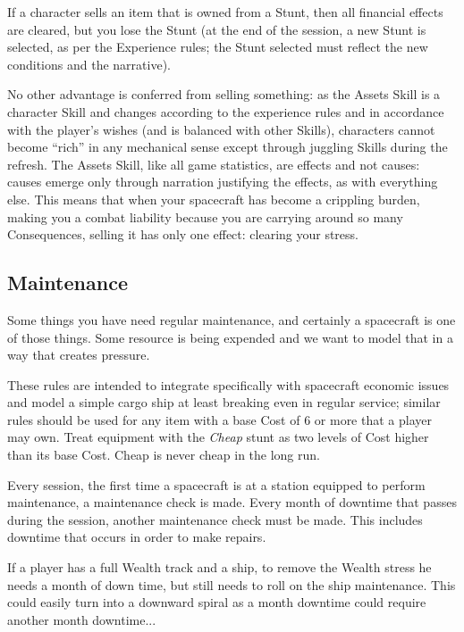 If a character sells an item that is owned from a Stunt, then all financial effects are cleared, but you lose the Stunt (at the end of the session, a new Stunt is selected, as per the Experience rules; the Stunt selected must reflect the new conditions and the narrative).

No other advantage is conferred from selling something: as the Assets Skill is a character Skill and changes according to the experience rules and in accordance with the player's wishes (and is balanced with other Skills), characters cannot become ``rich'' in any mechanical sense except through juggling Skills during the refresh. The Assets Skill, like all game statistics, are effects and not causes: causes emerge only through narration justifying the effects, as with everything else. This means that when your spacecraft has become a crippling burden, making you a combat liability because you are carrying around so many Consequences, selling it has only one effect: clearing your stress.


\subsection{Maintenance}\label{sec:Maintenance} %

Some things you have need regular maintenance, and certainly a spacecraft is one of those things. Some resource is being expended and we want to model that in a way that creates pressure.

These rules are intended to integrate specifically with spacecraft economic issues and model a simple cargo ship at least breaking even in regular service; similar rules should be used for any item with a base Cost of 6 or more that a player may own. Treat equipment with the \emph{Cheap} stunt as two levels of Cost higher than its base Cost. Cheap is never cheap in the long run.

Every session, the first time a spacecraft is at a station equipped to perform maintenance, a maintenance check is made. Every month of downtime that passes during the session, another maintenance check must be made. This includes downtime that occurs in order to make repairs.

If a player has a full Wealth track and a ship, to remove the Wealth stress he needs a month of down time, but still needs to roll on the ship maintenance. This could easily turn into a downward spiral as a month downtime could require another month downtime...

